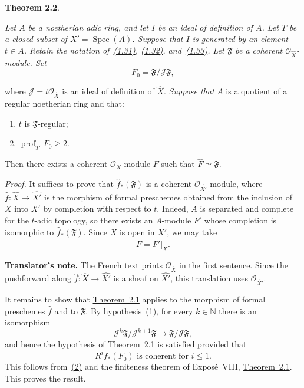 \medskip
{}\noindent\textbf{Theorem 2.2}.\quad
{\itshape Let $A$ be a noetherian adic ring, and let $I$ be an ideal of
definition of $A$. Let $T$ be a closed subset of
$X'=\operatorname{Spec}(A)$. Suppose that $I$ is generated by an element
$t\in A$. Retain the notation of~\hyperref[eq:IX.1.31]{(1.31)}, \hyperref[eq:IX.1.32]{(1.32)}, and~\hyperref[eq:IX.1.33]{(1.33)}. Let
$\mathfrak F$ be a coherent $\mathcal O_{\widehat X}$-module. Set
\begin{equation}
\tag{2.8}\label{eq:IX.2.8}
F_0=\mathfrak F/\mathcal J\mathfrak F,
\end{equation}
\par\smallskip
{}
\par\smallskip
where $\mathcal J=t\mathcal O_{\widehat X}$ is an ideal of definition of
$\widehat X$. \emph{Suppose that} $A$ is a quotient of a regular
noetherian ring and that:
\begin{enumerate}
\renewcommand{\labelenumi}{(\arabic{enumi})}
\setlength{\itemsep}{0.35em}
\item $t$ is $\mathfrak F$-regular;
\item $\operatorname{prof}_{T'}F_0\geq 2$.
\end{enumerate}
Then there exists a coherent $\mathcal O_X$-module $F$ such that
$\widehat F\simeq\mathfrak F$.}

\medskip
\noindent\textit{Proof.}\quad
It suffices to prove that $\widehat f_*(\mathfrak F)$ is a coherent
$\mathcal O_{\widehat{X'}}$-module, where
$\widehat f\colon\widehat X\to\widehat{X'}$ is the morphism of formal
preschemes obtained from the inclusion of $X$ into $X'$ by completion with
respect to $t$. Indeed, $A$ is separated and complete for the $t$-adic
topology, so there exists an $A$-module $F'$ whose completion is isomorphic
to $\widehat f_*(\mathfrak F)$. Since $X$ is open in $X'$, we may take
\[
F=\widetilde{F'}\big|_X.
\]

\noindent\colorbox{softgray}{\parbox{0.95\linewidth}{\footnotesize
\color{notegray}\textbf{Translator's note.}
The French text prints
$\mathcal O_{\widehat X}$ in the first sentence. Since the pushforward along
$\widehat f\colon\widehat X\to\widehat{X'}$ is a sheaf on $\widehat{X'}$,
this translation uses $\mathcal O_{\widehat{X'}}$.}}

\medskip
It remains to show that \hyperref[IX.2.1]{Theorem~2.1} applies to the morphism of formal
preschemes $\widehat f$ and to $\mathfrak F$. By hypothesis~\hyperref[IX.2.2]{(1)}, for every
$k\in\mathbb N$ there is an isomorphism
\[
\mathcal J^k\mathfrak F/\mathcal J^{k+1}\mathfrak F
  \to \mathfrak F/\mathcal J\mathfrak F,
\]
and hence the hypothesis of \hyperref[IX.2.1]{Theorem~2.1} is satisfied provided that
\[
R^i f_*(F_0)\text{ is coherent for }i\leq 1.
\]
This follows from~\hyperref[IX.2.2]{(2)} and the finiteness theorem of Expos\'e~VIII,
\hyperref[IX.2.1]{Theorem~2.1}. This proves the result.

